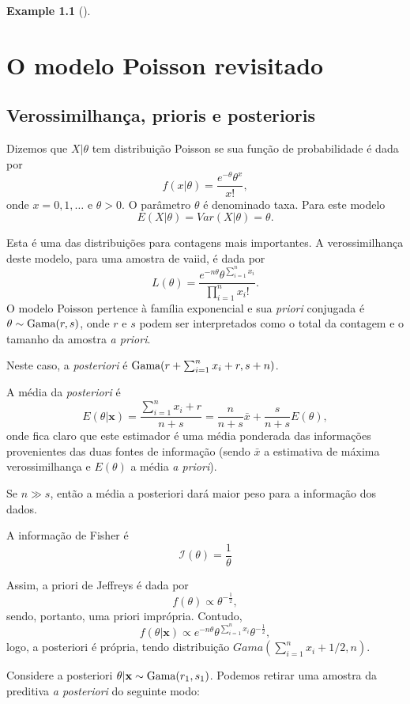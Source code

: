 \documentclass[
  letterpaper,
  DIV=11,
  numbers=noendperiod]{scrreprt}
\theoremstyle{definition}
\theoremstyle{plain}
\theoremstyle{definition}
\newtheorem{example}{Example}[chapter]
\theoremstyle{remark}
\begin{document}
\begin{example}[]

\chapter{O modelo Poisson revisitado}\label{o-modelo-poisson-revisitado}

\section{Verossimilhança, prioris e
posterioris}\label{verossimilhanuxe7a-prioris-e-posterioris}

Dizemos que \(X|\theta\) tem distribuição Poisson se sua função de
probabilidade é dada por \[f(x|\theta)=\frac{e^{-\theta}\theta^x}{x!},\]
onde \(x=0,1,\ldots\) e \(\theta>0\). O parâmetro \(\theta\) é
denominado taxa. Para este modelo \[E(X|\theta)=Var(X|\theta)=\theta.\]

Esta é uma das distribuições para contagens mais importantes. A
verossimilhança deste modelo, para uma amostra de vaiid, é dada por
\[L(\theta)=\frac{e^{-n\theta}\theta^{\sum_{i=1}^{n}x_i}}{\prod_{i=1}^{n}x_i!}.\]
O modelo Poisson pertence à família exponencial e sua \textit{priori}
conjugada é \(\theta\sim\hbox{Gama}(r,s)\), onde \(r\) e \(s\) podem ser
interpretados como o total da contagem e o tamanho da amostra
\textit{a priori}.

Neste caso, a \textit{posteriori} é
\(\hbox{Gama}(r+\sum_{i=1}^n x_i+r, s+n)\).

A média da \textit{posteriori} é
\[E(\theta|\mathbf{x})=\frac{\sum_{i=1}^{n}x_i+r}{n+s}=\frac{n}{n+s}\bar{x}+\frac{s}{n+s}E(\theta),\]
onde fica claro que este estimador é uma média ponderada das informações
provenientes das duas fontes de informação (sendo \(\bar{x}\) a
estimativa de máxima verossimilhança e \(E(\theta)\) a média
\textit{a priori}).

Se \(n\gg s\), então a média a posteriori dará maior peso para a
informação dos dados.

A informação de Fisher é \[\mathcal{I}(\theta)=\frac{1}{\theta}\]

Assim, a priori de Jeffreys é dada por
\[f(\theta)\propto \theta^{-\frac{1}{2}},\] sendo, portanto, uma priori
imprópria. Contudo,
\[f(\theta|\mathbf{x})\propto e^{-n\theta}\theta^{\sum_{i=1}^{n}x_i} \theta^{-\frac{1}{2}},\]
logo, a posteriori é própria, tendo distribuição
\(Gama(\sum_{i=1}^{n}x_i+1/2,n)\).

Considere a posteriori \(\theta|\mathbf{x}\sim\hbox{Gama}(r_1,s_1)\).
Podemos retirar uma amostra da preditiva \textit{a posteriori} do
seguinte modo:


\end{example}
\end{document}

